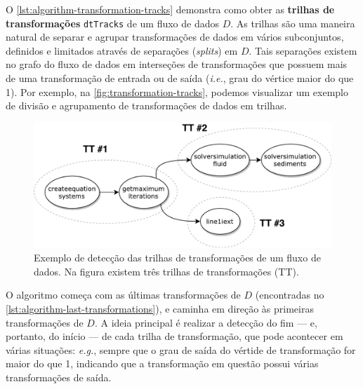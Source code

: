 O \autoref{lst:algorithm-transformation-tracks} demonstra como obter as \textbf{trilhas de transformações} \texttt{dtTracks} de um fluxo de dados \( D \). As trilhas são uma maneira natural de separar e agrupar transformações de dados em vários subconjuntos, definidos e limitados através de separações (\textit{splits}) em \( D \). Tais separações existem no grafo do fluxo de dados em interseções de transformações que possuem mais de uma transformação de entrada ou de saída (\textit{i.e.}, grau do vértice maior do que 1). Por exemplo, na \autoref{fig:transformation-tracks}, podemos visualizar um exemplo de divisão e agrupamento de transformações de dados em trilhas.

\begin{figure}[htb]
    \centering
    \includegraphics[width=\textwidth]{img/transformation-tracks}
    \caption[Exemplo de detecção das trilhas de transformações.]{Exemplo de detecção das trilhas de transformações de um fluxo de dados. Na figura existem três trilhas de transformações (\textsc{TT}).}%
    \label{fig:transformation-tracks}
\end{figure}

O algoritmo começa com as últimas transformações de \( D \) (encontradas no \autoref{lst:algorithm-last-transformations}), e caminha em direção às primeiras transformações de \( D \). A ideia principal é realizar a detecção do fim --- e, portanto, do início --- de cada trilha de transformação, que pode acontecer em várias situações: \textit{e.g.}, sempre que o grau de saída do vértide de transformação for maior do que 1, indicando que a transformação em questão possui várias transformações de saída.

